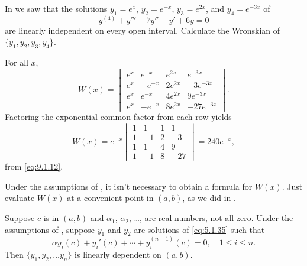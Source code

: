 \begin{example}\label{example:9.1.4}
In
 we saw that the solutions $y_1=e^x$,
$y_2=e^{-x}$,
$y_3=e^{2x}$, and $y_4=e^{-3x}$ of
\[
y^{(4)}+y'''-7y''-y'+6y=0
\]
are linearly independent on every open interval.
Calculate the Wronskian  of $\{y_1,y_2,y_3,y_4\}$.
\end{example}

\begin{solution}
For all $x$,
\[
W(x)=\begin{vmatrix}
e^x&e^{-x}&e^{2x}&e^{-3x}\\
e^x&-e^{-x}&2e^{2x}&-3e^{-3x}\\
e^x&e^{-x}&4e^{2x}&9e^{-3x}\\
e^x&-e^{-x}&8e^{2x}&-27e^{-3x}
\end{vmatrix}.
\]
Factoring the exponential common factor from each row yields
\[
W(x)
=e^{-x}\begin{vmatrix}1&1&1&1\\1&-1&2&-3\\1&1&4&9\\1&-1&8&-27\end{vmatrix}
=240e^{-x},
\]
from \eqref{eq:9.1.12}.
\end{solution}

\begin{remark*}
Under the assumptions of , it isn't
necessary to obtain a formula for $W(x)$. Just evaluate $W(x)$
at a convenient point in $(a,b)$, as we did in
.
\end{remark*}


\begin{theorem}\label{thmtype:9.1.5}
Suppose $c$ is in $(a,b)$ and $\alpha_{1}$, $\alpha_{2}$, \dots,
are real numbers, not all zero.
Under the assumptions of , suppose
$y_{1}$ and $y_{2}$ are  solutions  of \eqref{eq:5.1.35}   such that
\begin{equation} \label{eq:9.1.16}
\alpha y_{i}(c)+ y_{i}'(c)+\cdots +y_{i}^{(n-1)}(c)=0,\quad 1\le i\le n.
\end{equation}
Then $\{y_{1},y_{2},\dots y_{n}\}$ is linearly dependent on $(a,b)$.
\end{theorem}


